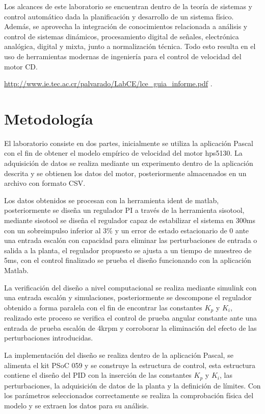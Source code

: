 \documentclass[conference]{IEEEtran}
\begin{document}
Los alcances de este laboratorio se encuentran dentro de la teoría de sistemas y control automático dada la planificación y desarrollo de un sistema físico. Además, se aprovecha la integración de conocimientos relacionada a análisis y control de sistemas dinámicos, procesamiento digital de señales, electrónica analógica, digital y mixta, junto a normalización técnica. Todo esto resulta en el uso de herramientas modernas de ingeniería para el control de velocidad del motor CD.

\underline{\url{http://www.ie.tec.ac.cr/palvarado/LabCE/lce_guia_informe.pdf}} \cite{Pablo2018}.
\section{Metodología}

El laboratorio consiste en dos partes, inicialmente se utiliza la aplicación Pascal con el fin de obtener el modelo empírico de velocidad del motor hps5130. La adquisición de datos se realiza mediante un experimento dentro de la aplicación descrita y se obtienen los datos del motor, posteriormente almacenados en un archivo con formato CSV.

Los datos obtenidos se procesan con la herramienta ident de matlab, posteriormente se diseña un regulador PI a través de la herramienta sisotool, mediante sisotool se diseña el regulador capaz de estabilizar el sistema en 300ms con un sobreimpulso inferior al 3\% y un error de estado estacionario de 0 ante una entrada escalón con capacidad para eliminar las perturbaciones de entrada o salida a la planta, el regulador propuesto se ajusta a un tiempo de muestreo de 5ms, con el control finalizado se prueba el diseño funcionando con la aplicación Matlab.

La verificación del diseño a nivel computacional se realiza mediante simulink con una entrada escalón y simulaciones, posteriormente se descompone el regulador obtenido a forma paralela con el fin de encontrar las constantes $K_p$ y $K_i$, realizado este proceso se verifica el control de prueba angular constante ante una entrada de prueba escalón de 4krpm y corroborar la eliminación del efecto de las perturbaciones introducidas.

La implementación del diseño se realiza dentro de la aplicación Pascal, se alimenta el kit PSoC 059 y se construye la estructura de control, esta estructura contiene el diseño del PID con la inserción de las constantes $K_p$ y $K_i$, las perturbaciones, la adquisición de datos de la planta y la definición de límites. Con los parámetros seleccionados correctamente se realiza la comprobación física del modelo y se extraen los datos para su análisis.
\end{document}
